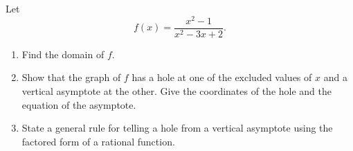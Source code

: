 Let
\[
f(x)=\dfrac{x^2-1}{x^2-3x+2}.
\]
\begin{enumerate}
\item[(a)] Find the domain of $f$.
\item[(b)] Show that the graph of $f$ has a hole at one of the excluded values of $x$ and a vertical asymptote at the other. Give the coordinates of the hole and the equation of the asymptote.
\item[(c)] State a general rule for telling a hole from a vertical asymptote using the factored form of a rational function.
\end{enumerate}
